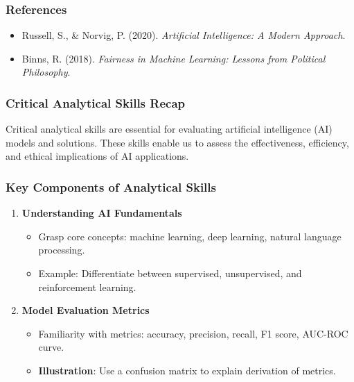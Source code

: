 \documentclass[aspectratio=169]{beamer}
\begin{document}
\begin{frame}[fragile]
    \frametitle{References}
    \begin{itemize}
        \item Russell, S., \& Norvig, P. (2020). \textit{Artificial Intelligence: A Modern Approach}.
        \item Binns, R. (2018). \textit{Fairness in Machine Learning: Lessons from Political Philosophy}.
    \end{itemize}
\end{frame}

\begin{frame}[fragile]
    \frametitle{Critical Analytical Skills Recap}
    Critical analytical skills are essential for evaluating artificial intelligence (AI) models and solutions. These skills enable us to assess the effectiveness, efficiency, and ethical implications of AI applications.
\end{frame}

\begin{frame}[fragile]
    \frametitle{Key Components of Analytical Skills}
    \begin{enumerate}
        \item \textbf{Understanding AI Fundamentals}
        \begin{itemize}
            \item Grasp core concepts: machine learning, deep learning, natural language processing.
            \item Example: Differentiate between supervised, unsupervised, and reinforcement learning.
        \end{itemize}
        \item \textbf{Model Evaluation Metrics}
        \begin{itemize}
            \item Familiarity with metrics: accuracy, precision, recall, F1 score, AUC-ROC curve.
            \item \textbf{Illustration}: Use a confusion matrix to explain derivation of metrics.
        \end{itemize}
    \end{enumerate}
\end{frame}
\end{document}
